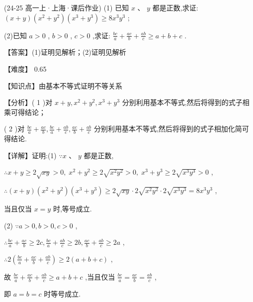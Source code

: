 \documentclass[11pt,a4paper]{article}
\begin{document}
\sclear
\begin{hmwk} 
 (24-25 高一上·上海·课后作业) (1) 已知 \(\displaystyle x\) 、 \(\displaystyle y\) 都是正数,求证: \(\displaystyle \left( {x + y}\right) \left( {{x}^{2} + {y}^{2}}\right) \left( {{x}^{3} + {y}^{3}}\right)  \geq  8{x}^{3}{y}^{3}\) ;

(2)已知 \(\displaystyle a > 0\) , \(\displaystyle b > 0\) , \(\displaystyle c > 0\) ,求证: \(\displaystyle \frac{bc}{a} + \frac{ac}{b} + \frac{ab}{c} \geq  a + b + c\) .

\begin{jiexi}
【答案】(1)证明见解析；(2)证明见解析

【难度】 0.65

【知识点】由基本不等式证明不等关系

【分析】( 1 )对 \(\displaystyle x + y,{x}^{2} + {y}^{2},{x}^{3} + {y}^{3}\) 分别利用基本不等式,然后将得到的式子相乘可得结论；

( 2 )对 \(\displaystyle \frac{bc}{a} + \frac{ac}{b},\frac{bc}{a} + \frac{ab}{c},\frac{ac}{b} + \frac{ab}{c}\) 分别利用基本不等式,然后将得到的式子相加化简可得结论.

【详解】证明:(1) \(\displaystyle \because x\) 、 \(\displaystyle y\) 都是正数,

\(\displaystyle \therefore x + y \geq  2\sqrt{xy} > 0,\;{x}^{2} + {y}^{2} \geq  2\sqrt{{x}^{2}{y}^{2}} > 0,\;{x}^{3} + {y}^{3} \geq  2\sqrt{{x}^{3}{y}^{3}} > 0\) ,

\(\displaystyle \therefore \left( {x + y}\right) \left( {{x}^{2} + {y}^{2}}\right) \left( {{x}^{3} + {y}^{3}}\right)  \geq  2\sqrt{xy} \cdot  2\sqrt{{x}^{2}{y}^{2}} \cdot  2\sqrt{{x}^{3}{y}^{3}} = 8{x}^{3}{y}^{3}\) ,

当且仅当 \(\displaystyle x = y\) 时,等号成立.

(2) \(\displaystyle \because a > 0,b > 0,c > 0\) ,

\(\displaystyle \therefore \frac{bc}{a} + \frac{ac}{b} \geq  {2c},\frac{bc}{a} + \frac{ab}{c} \geq  {2b},\frac{ac}{b} + \frac{ab}{c} \geq  {2a}\) ,

\(\displaystyle \therefore 2\left( {\frac{bc}{a} + \frac{ac}{b} + \frac{ab}{c}}\right)  \geq  2\left( {a + b + c}\right)\) ,

故 \(\displaystyle \frac{bc}{a} + \frac{ac}{b} + \frac{ab}{c} \geq  a + b + c\) ,当且仅当 \(\displaystyle \frac{bc}{a} = \frac{ac}{b} = \frac{ab}{c}\) ,

即 \(\displaystyle a = b = c\) 时等号成立.
\end{jiexi}
\end{hmwk}
\end{document}
